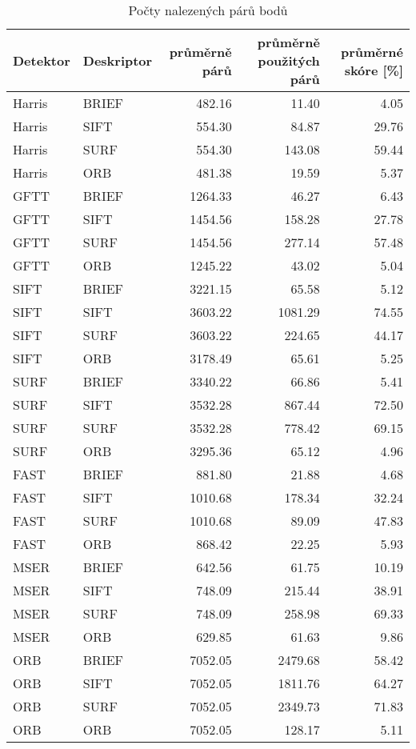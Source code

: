 \begin{table}[htbp]\centering
\begin{tabular}{ l l| r r r }
	Detektor & Deskriptor & průměrně párů & průměrně použitých párů & průměrné skóre [\%] \\
	\hline
	 Harris &  BRIEF & 482.16 & 11.40 & 4.05 \\
	 Harris &  SIFT & 554.30 & 84.87 & 29.76 \\
	 Harris &  SURF & 554.30 & 143.08 & 59.44 \\
	 Harris &  ORB & 481.38 & 19.59 & 5.37 \\
	 GFTT &  BRIEF & 1264.33 & 46.27 & 6.43 \\
	 GFTT &  SIFT & 1454.56 & 158.28 & 27.78 \\
	 GFTT &  SURF & 1454.56 & 277.14 & 57.48 \\
	 GFTT &  ORB & 1245.22 & 43.02 & 5.04 \\
	 SIFT &  BRIEF & 3221.15 & 65.58 & 5.12 \\
	 SIFT &  SIFT & 3603.22 & 1081.29 & 74.55 \\
	 SIFT &  SURF & 3603.22 & 224.65 & 44.17 \\
	 SIFT &  ORB & 3178.49 & 65.61 & 5.25 \\
	 SURF &  BRIEF & 3340.22 & 66.86 & 5.41 \\
	 SURF &  SIFT & 3532.28 & 867.44 & 72.50 \\
	 SURF &  SURF & 3532.28 & 778.42 & 69.15 \\
	 SURF &  ORB & 3295.36 & 65.12 & 4.96 \\
	 FAST &  BRIEF & 881.80 & 21.88 & 4.68 \\
	 FAST &  SIFT & 1010.68 & 178.34 & 32.24 \\
	 FAST &  SURF & 1010.68 & 89.09 & 47.83 \\
	 FAST &  ORB & 868.42 & 22.25 & 5.93 \\
	 MSER &  BRIEF & 642.56 & 61.75 & 10.19 \\
	 MSER &  SIFT & 748.09 & 215.44 & 38.91 \\
	 MSER &  SURF & 748.09 & 258.98 & 69.33 \\
	 MSER &  ORB & 629.85 & 61.63 & 9.86 \\
	 ORB &  BRIEF & 7052.05 & 2479.68 & 58.42 \\
	 ORB &  SIFT & 7052.05 & 1811.76 & 64.27 \\
	 ORB &  SURF & 7052.05 & 2349.73 & 71.83 \\
	 ORB &  ORB & 7052.05 & 128.17 & 5.11
\end{tabular}
	\caption[Short Heading]{\protect Počty nalezených párů bodů}\label{tab_matchcount}
\end{table}
